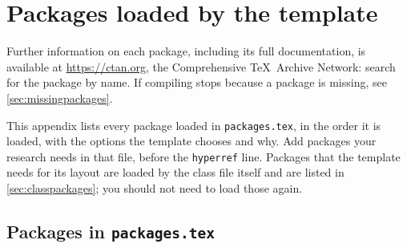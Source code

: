 
\chapter{Packages loaded by the template}
\label{app:packages}

Further information on each package, including its full documentation, is available at \url{https://ctan.org}, the Comprehensive \TeX\ Archive Network: search for the package by name. If compiling stops because a package is missing, see \cref{sec:missingpackages}.

This appendix lists every package loaded in \texttt{packages.tex}, in the order it is loaded, with the options the template chooses and why. Add packages your research needs in that file, before the \texttt{hyperref} line. Packages that the template needs for its layout are loaded by the class file itself and are listed in \cref{sec:classpackages}; you should not need to load those again.

\section{Packages in \texttt{packages.tex}}
\label{sec:packagestex}

